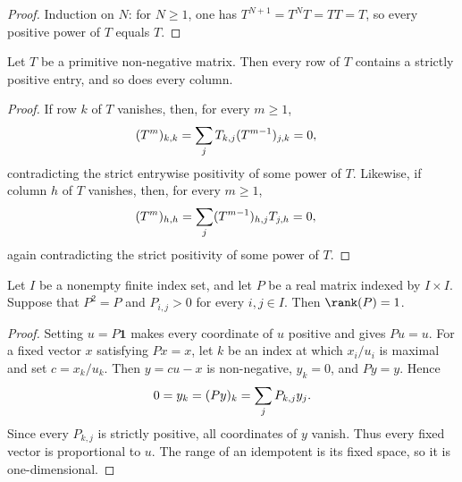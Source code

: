 \begin{proof}
    \leanok
    Induction on $N$: for $N\geq1$, one has
    $T^{N+1}=T^NT=TT=T$, so every positive power of $T$ equals $T$.
\end{proof}

\begin{lemma}
    \label{thm:matrix_primitive_row_col_pos}
    \leanok
    Let $T$ be a primitive non-negative matrix. Then every row of $T$ contains
    a strictly positive entry, and so does every column.
\end{lemma}

\begin{proof}
    \leanok
    If row $k$ of $T$ vanishes, then, for every $m\geq1$,
    \begin{align}
        (T^m)_{k,k}
         & =\sum_jT_{k,j}(T^{m-1})_{j,k}=0,
        \notag
    \end{align}
    contradicting the strict entrywise positivity of some power of $T$.
    Likewise, if column $h$ of $T$ vanishes, then, for every $m\geq1$,
    \begin{align}
        (T^m)_{h,h}
         & =\sum_j(T^{m-1})_{h,j}T_{j,h}=0,
        \notag
    \end{align}
    again contradicting the strict positivity of some power of $T$.
\end{proof}

\begin{lemma}
    \label{thm:matrix_positive_idempotent_rank_one}
    \leanok
    Let $I$ be a nonempty finite index set, and let $P$ be a real matrix
    indexed by $I\times I$. Suppose that $P^2=P$ and $P_{i,j}>0$ for every
    $i,j\in I$. Then $\rank(P)=1$.
\end{lemma}

\begin{proof}
    \leanok
    Setting $u=P\mathbf 1$ makes every coordinate of $u$ positive and gives
    $Pu=u$. For a fixed vector $x$ satisfying $Px=x$, let $k$ be an index at
    which $x_i/u_i$ is maximal and set $c=x_k/u_k$. Then $y=cu-x$ is
    non-negative, $y_k=0$, and $Py=y$. Hence
    \begin{align}
        0=y_k=(Py)_k=\sum_jP_{k,j}y_j.
        \notag
    \end{align}
    Since every $P_{k,j}$ is strictly positive, all coordinates of $y$ vanish.
    Thus every fixed vector is proportional to $u$. The range of an idempotent
    is its fixed space, so it is one-dimensional.
\end{proof}

